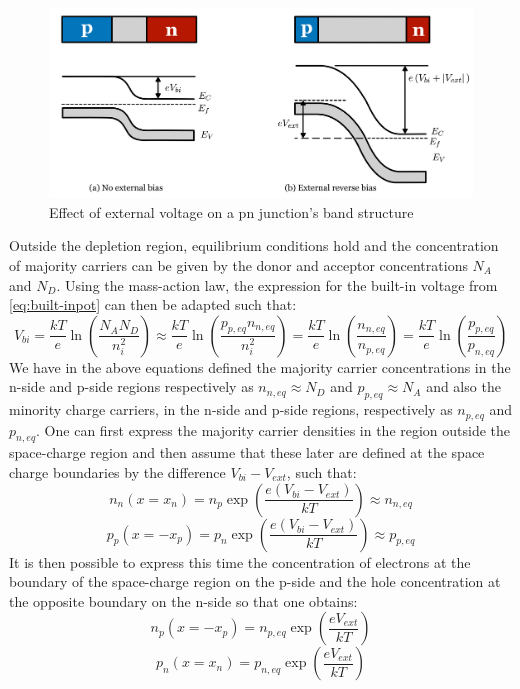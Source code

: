 		\begin{figure}[h]
		\centering
		\includegraphics[width=1.0\linewidth]{files/pn_external_voltage}
		\caption{Effect of external voltage on a pn junction's band structure}
		\label{ }
		\end{figure}

	Outside the depletion region, equilibrium conditions hold and the concentration of majority carriers can be given by the donor and acceptor concentrations $N_A$ and $N_D$. 
	\clearpage
	Using the mass-action law, the expression for the built-in voltage from \eqref{eq:built-inpot} can then be adapted such that: 
	\begin{equation}
		V_{bi} = \frac{kT}{e} \ln(\frac{N_A N_D}{n_i^2}) \approx \frac{kT}{e} \ln(\frac{p_{p, eq} n_{n, eq}}{n_i^2}) = \frac{kT}{e} \ln(\frac{n_{n, eq}}{n_{p, eq}}) = \frac{kT}{e} \ln(\frac{p_{p, eq}}{p_{n, eq}})
	\end{equation}
	We have in the above equations defined the majority carrier concentrations in the n-side and p-side regions respectively as $n_{n, eq} \approx N_D$ and $p_{p, eq} \approx N_A$ and also the minority charge carriers, in the n-side and p-side regions, respectively as $n_{p, eq}$ and $p_{n, eq}$. One can first express the majority carrier densities in the region outside the space-charge region and then assume that these later are defined at the space charge boundaries by the difference $V_{bi} - V_{ext}$, such that: 
	\begin{equation}
		n_n(x = x_n) = n_p \exp(\frac{e(V_{bi} - V_{ext})}{kT}) \approx n_{n, eq}
	\end{equation}
	\begin{equation}
		p_p(x = -x_p) = p_n \exp(\frac{e(V_{bi} - V_{ext})}{kT}) \approx p_{p, eq}
	\end{equation}
	It is then possible to express this time the concentration of electrons at the boundary of the space-charge region on the p-side and the hole concentration at the opposite boundary on the n-side so that one obtains: 
	\begin{equation}
		n_p(x = -x_p) = n_{p, eq} \exp(\frac{e V_{ext}}{kT})
	\end{equation} 
	\begin{equation}
		p_n(x = x_n) = p_{n, eq} \exp(\frac{e V_{ext}}{kT})
	\end{equation}

